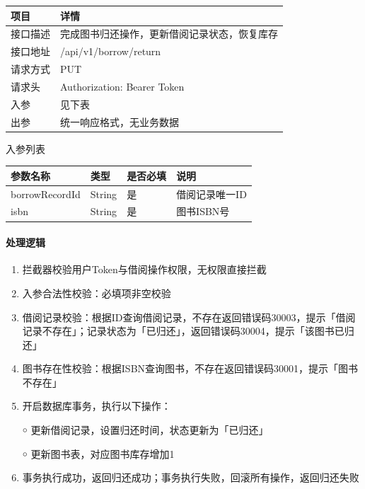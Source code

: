 \documentclass[12pt, a4paper]{article}
\begin{document}
\begin{table}[H]
    \centering
    \begin{tabular}{|l|l|}
        \hline
        项目 & 详情 \\
        \hline
        接口描述 & 完成图书归还操作，更新借阅记录状态，恢复库存 \\
        \hline
        接口地址 & /api/v1/borrow/return \\
        \hline
        请求方式 & PUT \\
        \hline
        请求头 & Authorization: Bearer {Token} \\
        \hline
        入参 & 见下表 \\
        \hline
        出参 & 统一响应格式，无业务数据 \\
        \hline
    \end{tabular}
\end{table}

入参列表

\begin{table}[H]
    \centering
    \begin{tabular}{|l|l|l|l|}
        \hline
        参数名称 & 类型 & 是否必填 & 说明 \\
        \hline
        borrowRecordId & String & 是 & 借阅记录唯一ID \\
        \hline
        isbn & String & 是 & 图书ISBN号 \\
        \hline
    \end{tabular}
\end{table}

\paragraph{处理逻辑}
\begin{enumerate}
\item 拦截器校验用户Token与借阅操作权限，无权限直接拦截

\item 入参合法性校验：必填项非空校验

\item 借阅记录校验：根据ID查询借阅记录，不存在返回错误码30003，提示「借阅记录不存在」；记录状态为「已归还」，返回错误码30004，提示「该图书已归还」

\item 图书存在性校验：根据ISBN查询图书，不存在返回错误码30001，提示「图书不存在」

\item 开启数据库事务，执行以下操作：

￮ 更新借阅记录，设置归还时间，状态更新为「已归还」

￮ 更新图书表，对应图书库存增加1

\item 事务执行成功，返回归还成功；事务执行失败，回滚所有操作，返回归还失败
\end{enumerate}
\newpage
\end{document}
